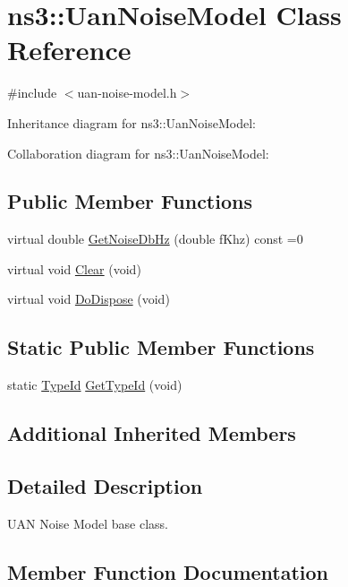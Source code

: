 \hypertarget{classns3_1_1UanNoiseModel}{}\section{ns3\+:\+:Uan\+Noise\+Model Class Reference}
\label{classns3_1_1UanNoiseModel}


{\ttfamily \#include $<$uan-\/noise-\/model.\+h$>$}



Inheritance diagram for ns3\+:\+:Uan\+Noise\+Model\+:


Collaboration diagram for ns3\+:\+:Uan\+Noise\+Model\+:
\subsection*{Public Member Functions}
\begin{DoxyCompactItemize}
\item 
virtual double \hyperlink{classns3_1_1UanNoiseModel_a963a2813cf26b67fa46dfb7d3d4ac097}{Get\+Noise\+Db\+Hz} (double f\+Khz) const =0
\item 
virtual void \hyperlink{classns3_1_1UanNoiseModel_afe5dcf7731c70a2e9a73709581e1717c}{Clear} (void)
\item 
virtual void \hyperlink{classns3_1_1UanNoiseModel_a8e997aa544ed9294dc87ed170b376c00}{Do\+Dispose} (void)
\end{DoxyCompactItemize}
\subsection*{Static Public Member Functions}
\begin{DoxyCompactItemize}
\item 
static \hyperlink{classns3_1_1TypeId}{Type\+Id} \hyperlink{classns3_1_1UanNoiseModel_a449a88cef2f92d8950c746e8651ab55a}{Get\+Type\+Id} (void)
\end{DoxyCompactItemize}
\subsection*{Additional Inherited Members}


\subsection{Detailed Description}
U\+AN Noise Model base class. 

\subsection{Member Function Documentation}
